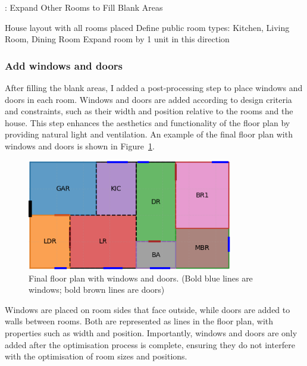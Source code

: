 \documentclass[]{article}
\begin{document}
\begin{algorithm}[H]
    \caption{: Expand Other Rooms to Fill Blank Areas}
    \label{alg:expand-other-rooms}
    \begin{algorithmic}[1]
        \REQUIRE House layout with all rooms placed
        \STATE Define public room types: Kitchen, Living Room, Dining Room
        \STATE Expand room by 1 unit in this direction
        \ENDWHILE
        \ENDFOR
        \ENDIF
        \ENDFOR
    \end{algorithmic}
\end{algorithm}

\subsubsection{Add windows and doors}
After filling the blank areas, I added a post-processing step to place windows and doors in each room. Windows and doors are added according to design criteria and constraints, such as their width and position relative to the rooms and the house. This step enhances the aesthetics and functionality of the floor plan by providing natural light and ventilation. An example of the final floor plan with windows and doors is shown in Figure~\ref{fig:add-door-window}.
\begin{figure}[h]
    \centering
    \includegraphics[width=0.8\textwidth]{images/add-door-window.png}
    \caption{Final floor plan with windows and doors. (Bold blue lines are windows; bold brown lines are doors)}
    \label{fig:add-door-window}
\end{figure}

Windows are placed on room sides that face outside, while doors are added to walls between rooms. Both are represented as lines in the floor plan, with properties such as width and position. Importantly, windows and doors are only added after the optimisation process is complete, ensuring they do not interfere with the optimisation of room sizes and positions.
\end{document}
